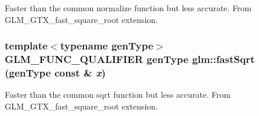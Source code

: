 Faster than the common normalize function but less accurate. From GLM\_\-GTX\_\-fast\_\-square\_\-root extension. \hypertarget{group__gtx__fast__square__root_g4a192efe46a74d13ab40067f7e3714e3}{
\subsubsection[fastSqrt]{\setlength{\rightskip}{0pt plus 5cm}template$<$typename genType$>$ GLM\_\-FUNC\_\-QUALIFIER genType glm::fastSqrt (genType const \& {\em x})}}
\label{group__gtx__fast__square__root_g4a192efe46a74d13ab40067f7e3714e3}


Faster than the common sqrt function but less accurate. From GLM\_\-GTX\_\-fast\_\-square\_\-root extension. 